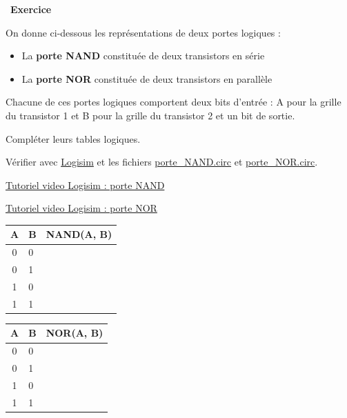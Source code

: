\documentclass[
  11pt,
]{article}
\providecommand{\tightlist}{%
  \setlength{\itemsep}{0pt}\setlength{\parskip}{0pt}}
\newcounter{exo}
\newenvironment{exercice}[1]
{\par \medskip   \addtocounter{exo}{1} \noindent  
\begin{bclogo}[arrondi =0.1,   noborder = true, logo=\bccrayon, marge=4]{~\textbf{Exercice} \textbf{\theexo} {\itshape #1} }  \par}
{
\end{bclogo}
 \par \bigskip }
\newcounter{logi}
\begin{document}
\begin{exercice}{}

On donne ci-dessous les représentations de deux portes logiques :

\begin{itemize}
\tightlist
\item
  La \textbf{porte NAND} constituée de deux transistors en série
\item
  La \textbf{porte NOR} constituée de deux transistors en parallèle
\end{itemize}

Chacune de ces portes logiques comportent deux bits d'entrée : A pour la
grille du transistor 1 et B pour la grille du transistor 2 et un bit de
sortie.

Compléter leurs tables logiques.

Vérifier avec \href{http://www.cburch.com/logisim/}{Logisim} et les
fichiers \href{circuits_logisim/porte_NAND.circ}{porte\_NAND.circ} et
\href{circuits_logisim/porte_NOR.circ}{porte\_NOR.circ}.

\href{videos/porteNAND.mp4}{Tutoriel video Logisim : porte NAND}

\href{videos/porteNOR.mp4}{Tutoriel video Logisim : porte NOR}

\begin{longtable}[]{@{}cll@{}}
\toprule
A & B & NAND(A, B)\tabularnewline
\midrule
\endhead
0 & 0 &\tabularnewline
0 & 1 &\tabularnewline
1 & 0 &\tabularnewline
1 & 1 &\tabularnewline
\bottomrule
\end{longtable}

\begin{longtable}[]{@{}cll@{}}
\toprule
A & B & NOR(A, B)\tabularnewline
\midrule
\endhead
0 & 0 &\tabularnewline
0 & 1 &\tabularnewline
1 & 0 &\tabularnewline
1 & 1 &\tabularnewline
\bottomrule
\end{longtable}

\end{exercice}
\end{document}
